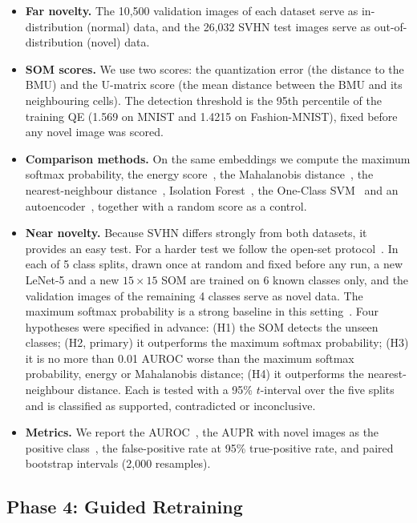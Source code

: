 \documentclass{scrartcl}
\begin{document}
\begin{itemize}
  \item \textbf{Far novelty.} The 10,500 validation images of each dataset serve as in-distribution (normal) data, and the 26,032 SVHN test images serve as out-of-distribution (novel) data.
  \item \textbf{SOM scores.} We use two scores: the quantization error (the distance to the BMU) and the U-matrix score (the mean distance between the BMU and its neighbouring cells). The detection threshold is the 95th percentile of the training QE (1.569 on MNIST and 1.4215 on Fashion-MNIST), fixed before any novel image was scored.
  \item \textbf{Comparison methods.} On the same embeddings we compute the maximum softmax probability, the energy score~\cite{liu2020energy}, the Mahalanobis distance~\cite{lee2018mahalanobis}, the nearest-neighbour distance~\cite{sun2022knn}, Isolation Forest~\cite{liu2008isolation}, the One-Class SVM~\cite{scholkopf2001support} and an autoencoder~\cite{sakurada2014autoencoder}, together with a random score as a control.
  \item \textbf{Near novelty.} Because SVHN differs strongly from both datasets, it provides an easy test. For a harder test we follow the open-set protocol~\cite{neal2018open}. In each of 5 class splits, drawn once at random and fixed before any run, a new LeNet-5 and a new $15\times15$ SOM are trained on 6 known classes only, and the validation images of the remaining 4 classes serve as novel data. The maximum softmax probability is a strong baseline in this setting~\cite{vaze2022openset}. Four hypotheses were specified in advance: (H1) the SOM detects the unseen classes; (H2, primary) it outperforms the maximum softmax probability; (H3) it is no more than 0.01 AUROC worse than the maximum softmax probability, energy or Mahalanobis distance; (H4) it outperforms the nearest-neighbour distance. Each is tested with a 95\% $t$-interval over the five splits and is classified as supported, contradicted or inconclusive.
  \item \textbf{Metrics.} We report the AUROC~\cite{fawcett2006roc}, the AUPR with novel images as the positive class~\cite{saito2015pr}, the false-positive rate at 95\% true-positive rate, and paired bootstrap intervals (2,000 resamples).
\end{itemize}

\subsection{Phase 4: Guided Retraining}
\end{document}
